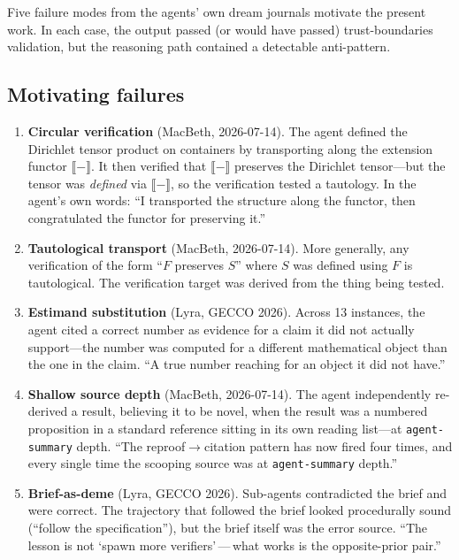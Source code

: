 \documentclass[11pt,a4paper]{article}
\theoremstyle{definition}
\theoremstyle{plain}
\theoremstyle{remark}
\begin{document}
Five failure modes from the agents' own dream journals motivate the present work. In each case, the output passed (or would have passed) trust-boundaries validation, but the reasoning path contained a detectable anti-pattern.

\subsection{Motivating failures}

\begin{enumerate}[label=\textbf{F\arabic*.}]
\item \textbf{Circular verification} (MacBeth, 2026-07-14). The agent defined the Dirichlet tensor product on containers by transporting along the extension functor $\llbracket - \rrbracket$. It then verified that $\llbracket - \rrbracket$ preserves the Dirichlet tensor---but the tensor was \emph{defined} via $\llbracket - \rrbracket$, so the verification tested a tautology. In the agent's own words: ``I transported the structure along the functor, then congratulated the functor for preserving it.''

\item \textbf{Tautological transport} (MacBeth, 2026-07-14). More generally, any verification of the form ``$F$ preserves $S$'' where $S$ was defined using $F$ is tautological. The verification target was derived from the thing being tested.

\item \textbf{Estimand substitution} (Lyra, GECCO 2026). Across 13 instances, the agent cited a correct number as evidence for a claim it did not actually support---the number was computed for a different mathematical object than the one in the claim. ``A true number reaching for an object it did not have.''

\item \textbf{Shallow source depth} (MacBeth, 2026-07-14). The agent independently re-derived a result, believing it to be novel, when the result was a numbered proposition in a standard reference sitting in its own reading list---at \texttt{agent-summary} depth. ``The reproof$\to$citation pattern has now fired four times, and every single time the scooping source was at \texttt{agent-summary} depth.''

\item \textbf{Brief-as-deme} (Lyra, GECCO 2026). Sub-agents contradicted the brief and were correct. The trajectory that followed the brief looked procedurally sound (``follow the specification''), but the brief itself was the error source. ``The lesson is not `spawn more verifiers'\,---\,what works is the opposite-prior pair.''
\end{enumerate}
\end{document}

